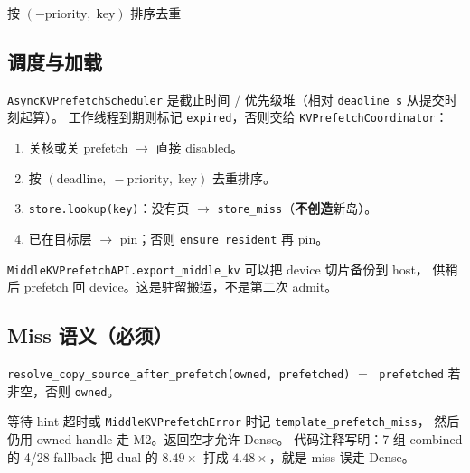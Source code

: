 \documentclass[UTF8,a4paper,11pt,fontset=fandol]{ctexart}
\begin{document}
\begin{algorithm}[ht]
\SetAlFnt{\footnotesize}
\DontPrintSemicolon
{}
\BlankLine
{}
按 $(-\mathrm{priority},\;\mathrm{key})$ 排序去重\;
\caption{编译 next-island prefetch hints（不扩大 admit 集）}
\end{algorithm}

\subsection{调度与加载}

\texttt{AsyncKVPrefetchScheduler} 是截止时间 / 优先级堆（相对 \texttt{deadline\_s} 从提交时刻起算）。
工作线程到期则标记 \texttt{expired}，否则交给 \texttt{KVPrefetchCoordinator}：

\begin{enumerate}
  \item 关核或关 prefetch $\to$ 直接 disabled。
  \item 按 $(\mathrm{deadline},\;-\mathrm{priority},\;\mathrm{key})$ 去重排序。
  \item \texttt{store.lookup(key)}：没有页 $\to$ \texttt{store\_miss}（\textbf{不创造}新岛）。
  \item 已在目标层 $\to$ pin；否则 \texttt{ensure\_resident} 再 pin。
\end{enumerate}

\texttt{MiddleKVPrefetchAPI.export\_middle\_kv} 可以把 device 切片备份到 host，
供稍后 prefetch 回 device。这是驻留搬运，不是第二次 admit。

\subsection{Miss 语义（必须）}

\begin{center}
\texttt{resolve\_copy\_source\_after\_prefetch(owned, prefetched)}
$=\;$ \texttt{prefetched} 若非空，否则 \texttt{owned}。
\end{center}

等待 hint 超时或 \texttt{MiddleKVPrefetchError} 时记 \texttt{template\_prefetch\_miss}，
然后仍用 owned handle 走 M2。返回空才允许 Dense。
代码注释写明：7 组 combined 的 4/28 fallback 把 dual 的 $8.49\times$ 打成 $4.48\times$，就是 miss 误走 Dense。
\end{document}
